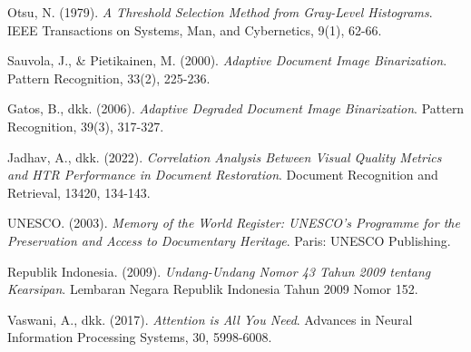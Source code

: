 \begin{thebibliography}{99}

Otsu, N. (1979).
\textit{A Threshold Selection Method from Gray-Level Histograms}.
IEEE Transactions on Systems, Man, and Cybernetics, 9(1), 62-66.

Sauvola, J., \& Pietikainen, M. (2000).
\textit{Adaptive Document Image Binarization}.
Pattern Recognition, 33(2), 225-236.

Gatos, B., dkk. (2006).
\textit{Adaptive Degraded Document Image Binarization}.
Pattern Recognition, 39(3), 317-327.


Jadhav, A., dkk. (2022).
\textit{Correlation Analysis Between Visual Quality Metrics and HTR Performance in Document Restoration}.
Document Recognition and Retrieval, 13420, 134-143.


UNESCO. (2003).
\textit{Memory of the World Register: UNESCO's Programme for the Preservation and Access to Documentary Heritage}.
Paris: UNESCO Publishing.

Republik Indonesia. (2009).
\textit{Undang-Undang Nomor 43 Tahun 2009 tentang Kearsipan}.
Lembaran Negara Republik Indonesia Tahun 2009 Nomor 152.


Vaswani, A., dkk. (2017).
\textit{Attention is All You Need}.
Advances in Neural Information Processing Systems, 30, 5998-6008.

\end{thebibliography}